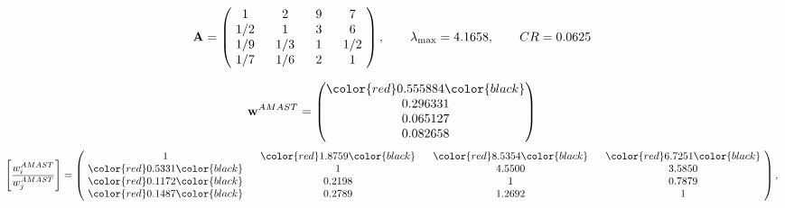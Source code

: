 \begin{example}
\begin{equation*}
\mathbf{A} =
\begin{pmatrix}
$\,\,$ 1 $\,\,$ & $\,\,$2$\,\,$ & $\,\,$9$\,\,$ & $\,\,$7 $\,\,$ \\
$\,\,$ 1/2$\,\,$ & $\,\,$ 1 $\,\,$ & $\,\,$3$\,\,$ & $\,\,$6 $\,\,$ \\
$\,\,$ 1/9$\,\,$ & $\,\,$ 1/3$\,\,$ & $\,\,$ 1 $\,\,$ & $\,\,$ 1/2 $\,\,$ \\
$\,\,$ 1/7$\,\,$ & $\,\,$ 1/6$\,\,$ & $\,\,$2$\,\,$ & $\,\,$ 1  $\,\,$ \\
\end{pmatrix},
\qquad
\lambda_{\max} =
4.1658,
\qquad
CR = 0.0625
\end{equation*}

\begin{equation*}
\mathbf{w}^{AMAST} =
\begin{pmatrix}
\color{red} 0.555884\color{black} \\
0.296331\\
0.065127\\
0.082658
\end{pmatrix}\end{equation*}
\begin{equation*}
\left[ \frac{{w}^{AMAST}_i}{{w}^{AMAST}_j} \right] =
\begin{pmatrix}
$\,\,$ 1 $\,\,$ & $\,\,$\color{red} 1.8759\color{black} $\,\,$ & $\,\,$\color{red} 8.5354\color{black} $\,\,$ & $\,\,$\color{red} 6.7251\color{black} $\,\,$ \\
$\,\,$\color{red} 0.5331\color{black} $\,\,$ & $\,\,$ 1 $\,\,$ & $\,\,$4.5500$\,\,$ & $\,\,$3.5850  $\,\,$ \\
$\,\,$\color{red} 0.1172\color{black} $\,\,$ & $\,\,$0.2198$\,\,$ & $\,\,$ 1 $\,\,$ & $\,\,$0.7879 $\,\,$ \\
$\,\,$\color{red} 0.1487\color{black} $\,\,$ & $\,\,$0.2789$\,\,$ & $\,\,$1.2692$\,\,$ & $\,\,$ 1  $\,\,$ \\
\end{pmatrix},
\end{equation*}


\end{example}
